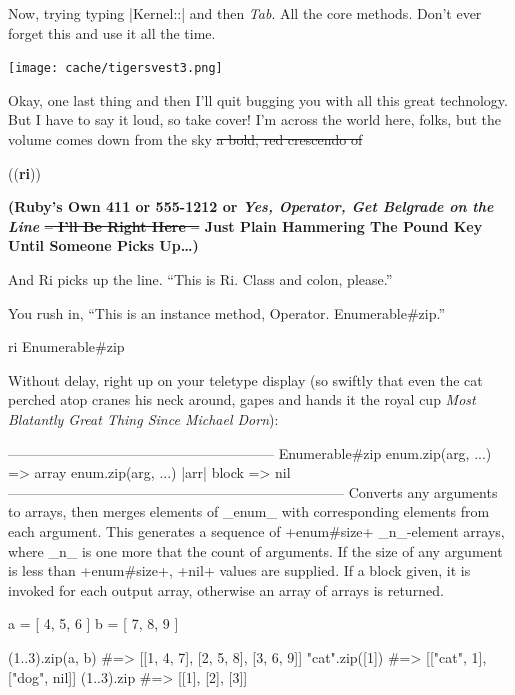 \documentclass[12pt,twoside]{report}
\begin{document}
Now, trying typing \consoleinline|Kernel::| and then
\emph{Tab}. All the core methods. Don't ever forget this and use it
all the time.

\texttt{[image: cache/tigersvest3.png]} 

Okay, one last thing and then I'll quit bugging you with all this
great technology. But I have to say it loud, so take cover! I'm across
the world here, folks, but the volume comes down from the sky \sout{a
bold, red crescendo of}

\begin{center}
{\Huge{\color{parensaroundricolor}((}\color{ricolor}\textbf{ri}{\color{parensaroundricolor}))}}
\end{center}

{\color{belgradeoperatorcolor}
\bf\large (Ruby's Own 411 or 555-1212 or \emph{Yes, Operator, Get
    Belgrade on the Line} \sout{-- I'll Be Right Here --} Just Plain
  Hammering The Pound Key Until Someone Picks Up\ldots)}

And Ri picks up the line.  ``This is Ri. Class and colon, please.''  

You rush in, ``This is an instance method, Operator. Enumerable\#zip.''

\begin{consolecode}
 ri Enumerable#zip
\end{consolecode}

Without delay, right up on your teletype display (so swiftly that even
the cat perched atop cranes his neck around, gapes and hands it the
royal cup \emph{Most Blatantly Great Thing Since Michael Dorn}):

\begin{consolecode}
 --------------------------------------------------------- Enumerable#zip
      enum.zip(arg, ...)                   => array
      enum.zip(arg, ...) {|arr| block }    => nil
 ------------------------------------------------------------------------
      Converts any arguments to arrays, then merges elements of _enum_
      with corresponding elements from each argument. This generates a
      sequence of +enum#size+ _n_-element arrays, where _n_ is one more
      that the count of arguments. If the size of any argument is less
      than +enum#size+, +nil+ values are supplied. If a block given, it
      is invoked for each output array, otherwise an array of arrays is
      returned.

         a = [ 4, 5, 6 ]
         b = [ 7, 8, 9 ]

         (1..3).zip(a, b)      #=> [[1, 4, 7], [2, 5, 8], [3, 6, 9]]
         "cat\ndog".zip([1])   #=> [["cat\n", 1], ["dog", nil]]
         (1..3).zip            #=> [[1], [2], [3]]
\end{consolecode}
\end{document}
